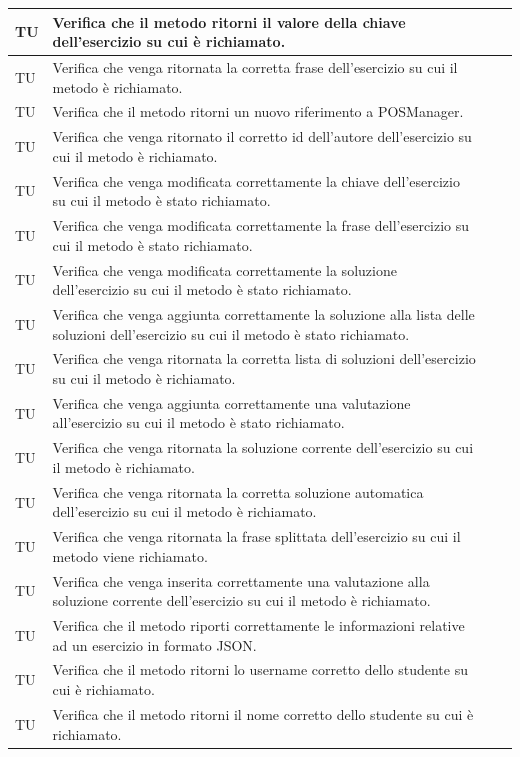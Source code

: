 \begin{longtable}{|>{\centering\arraybackslash}m{1.6cm}|>{\centering\arraybackslash}m{6.41cm}|>{\centering\arraybackslash}m{3.1cm}| c |}
		TU & Verifica che il metodo ritorni il valore della chiave dell'esercizio su cui è richiamato. \\ \hline
		TU & Verifica che venga ritornata la corretta frase dell'esercizio su cui il metodo è richiamato. \\ \hline
		TU & Verifica che il metodo ritorni un nuovo riferimento a POSManager.\\ \hline
		TU & Verifica che venga ritornato il corretto id dell'autore dell'esercizio su cui il metodo è richiamato.\\ \hline
		TU & Verifica che venga modificata correttamente la chiave dell'esercizio su cui il metodo è stato richiamato.\\ \hline
		TU & Verifica che venga modificata correttamente la frase dell'esercizio su cui il metodo è stato richiamato.\\ \hline
		TU & Verifica che venga modificata correttamente la soluzione dell'esercizio su cui il metodo è stato richiamato.\\ \hline
		TU & Verifica che venga aggiunta correttamente la soluzione alla lista delle soluzioni dell'esercizio su cui il metodo è stato richiamato.\\ \hline
		TU & Verifica che venga ritornata la corretta lista di soluzioni dell'esercizio su cui il metodo è richiamato.\\ \hline
		TU & Verifica che venga aggiunta correttamente una valutazione all'esercizio su cui il metodo è stato richiamato.\\ \hline
		TU & Verifica che venga ritornata la soluzione corrente dell'esercizio su cui il metodo è richiamato.\\ \hline
		TU & Verifica che venga ritornata la corretta soluzione automatica dell'esercizio su cui il metodo è richiamato. \\ \hline
		TU & Verifica che venga ritornata la frase splittata dell'esercizio su cui il metodo viene richiamato.\\ \hline
		TU & Verifica che venga inserita correttamente una valutazione alla soluzione corrente dell'esercizio su cui il metodo è richiamato.\\ \hline		
		TU & Verifica che il metodo riporti correttamente le informazioni relative ad un esercizio in formato JSON. \\ \hline	
		TU & Verifica che il metodo ritorni lo username corretto dello studente su cui è richiamato.\\ \hline
		TU & Verifica che il metodo ritorni il nome corretto dello studente su cui è richiamato.  \\ \hline

\end{longtable}

